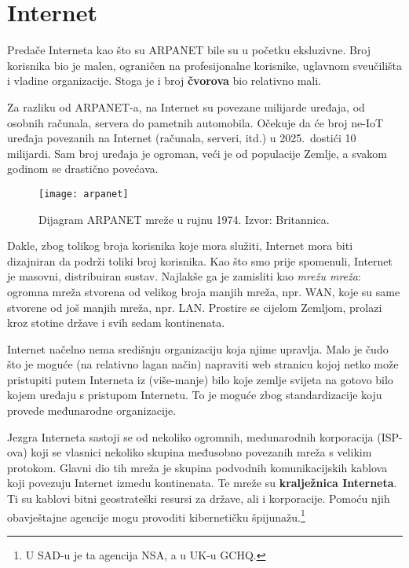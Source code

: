 \usepackage[utf8]{inputenc}
\usepackage[T1]{fontenc}%

\section[Internet]{Internet}

Predače Interneta kao što su ARPANET bile su u početku eksluzivne.
Broj korisnika bio je malen, ograničen na profesijonalne korisnike, uglavnom sveučilišta i vladine organizacije.
Stoga je i broj \textbf{čvorova} bio relativno mali.

Za razliku od ARPANET-a, na Internet su povezane milijarde uređaja, od osobnih računala, servera do pametnih automobila.
Očekuje da će broj ne-IoT uređaja povezanih na Internet (računala, serveri, itd.) u 2025.\ dostići 10 milijardi.
Sam broj uređaja je ogroman, veći je od populacije Zemlje, a svakom godinom se drastično povećava.


\begin{figure}[h]\label{fig:arpanet}
\texttt{[image: arpanet]}
\raggedleft
\caption{Dijagram ARPANET mreže u rujnu 1974. Izvor: Britannica.}
\end{figure}

Dakle, zbog tolikog broja korisnika koje mora služiti, Internet mora biti dizajniran da podrži toliki broj korisnika.
Kao što smo prije spomenuli, Internet je masovni, distribuiran sustav.
Najlakše ga je zamisliti kao \textit{mrežu mreža}: ogromna mreža stvorena od velikog broja manjih mreža, npr. WAN, koje su same stvorene od još manjih mreža, npr. LAN.
Prostire se cijelom Zemljom, prolazi kroz stotine države i svih sedam kontinenata.

Internet načelno nema središnju organizaciju koja njime upravlja.
Malo je čudo što je moguće (na relativno lagan način) napraviti web stranicu kojoj netko može pristupiti putem Interneta iz (više-manje) bilo koje zemlje svijeta na gotovo bilo kojem uređaju s pristupom Internetu.
To je moguće zbog standardizacije koju provede međunarodne organizacije.

Jezgra Interneta sastoji se od nekoliko ogromnih, medunarodnih korporacija (ISP-ova) koji se vlasnici nekoliko skupina međusobno povezanih  mreža s velikim protokom.
Glavni dio tih mreža je skupina podvodnih komunikacijskih kablova koji povezuju Internet izmedu kontinenata.
Te mreže su \textbf{kralježnica Interneta}.
Ti su kablovi bitni geostrateški resursi za države, ali i korporacije.
Pomoću njih obavještajne agencije mogu provoditi kibernetičku špijunažu.\footnote{U SAD-u je ta agencija NSA, a u UK-u GCHQ.}

